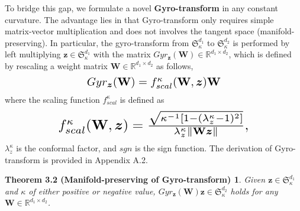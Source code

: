 

To bridge this gap, we formulate a novel \textbf{Gyro-transform} in any constant curvature.
The advantage lies in that Gyro-transform only requires simple matrix-vector multiplication and does not involves the tangent space (manifold-preserving).
In particular, 
the gyro-transform from $\mathfrak{S}_\kappa^{d_1}$ to $\mathfrak{S}_\kappa^{d_2}$  
is performed by
left multiplying $\boldsymbol z \in \mathfrak{S}_\kappa^{d_1}$ 
with the matrix $Gyr_{\boldsymbol z}(\mathbf W) \in \mathbb{R}^{{d_1}\times{d_2}}$, 
which is defined by rescaling a weight matrix  $\mathbf W \in \mathbb{R}^{{d_1}\times{d_2}}$ as follows,
\begin{equation}
\resizebox{0.47\hsize}{!}{$
    Gyr_{\boldsymbol z}(\mathbf W) = f_{scal}^\kappa(\mathbf W, \boldsymbol z) \mathbf W
$}
\label{GyroTransf}
\end{equation}
where the scaling function $f_{scal}^\kappa$ is defined as
\begin{equation}
\resizebox{0.666\hsize}{!}{$
f_{scal}^\kappa(\mathbf W, \boldsymbol z)=
\frac{\sqrt{\kappa^{-1}[1-(\lambda_z^\kappa-1)^2]}}{\lambda_z^\kappa \lVert \mathbf W\boldsymbol z \rVert},
$}
\label{ScaleFunc}
\end{equation}
$\lambda_z^\kappa$ is the conformal factor, and $sgn$ is the sign function.
The derivation of Gyro-transform is provided in Appendix A.2.
\newtheorem*{thm2}{Theorem 3.2 (Manifold-preserving of Gyro-transform)} 
\begin{thm2}
Given $\boldsymbol z \in \mathfrak{S}_{\kappa }^{d_1}$ and $\kappa$ of either positive or negative value,  
$Gyr_{\boldsymbol z}(\boldsymbol W)\boldsymbol z \in \mathfrak{S}_{\kappa }^{d_2}$ holds for any $\boldsymbol W \in \mathbb R^{{d_1}\times{d_2}}$.
\end{thm2}

